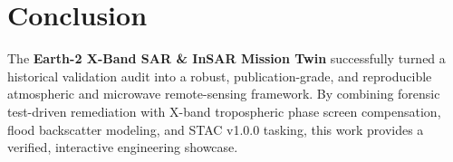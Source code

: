 \documentclass[10pt,twocolumn,a4paper]{article}
\begin{document}
\section{Conclusion}
The \textbf{Earth-2 X-Band SAR \& InSAR Mission Twin} successfully turned a historical validation audit into a robust, publication-grade, and reproducible atmospheric and microwave remote-sensing framework. By combining forensic test-driven remediation with X-band tropospheric phase screen compensation, flood backscatter modeling, and STAC v1.0.0 tasking, this work provides a verified, interactive engineering showcase.
\end{document}
